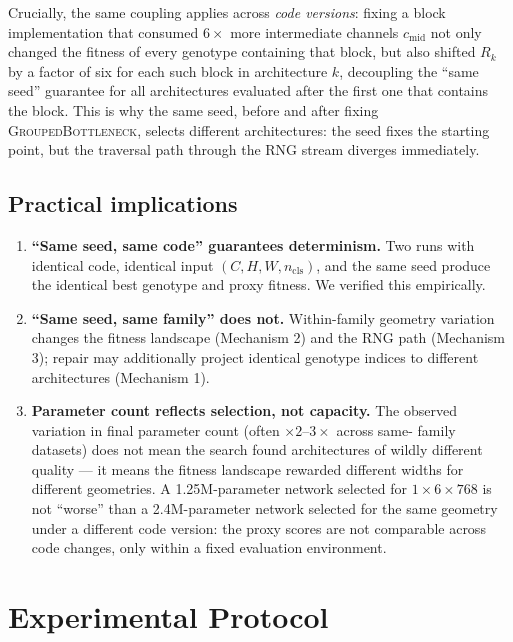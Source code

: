 \documentclass[10pt,twocolumn]{article}
\begin{document}
Crucially, the same coupling applies across \emph{code versions}: fixing a
block implementation that consumed $6\times$ more intermediate channels
$c_{\text{mid}}$ not only changed the fitness of every genotype containing that
block, but also shifted $R_k$ by a factor of six for each such block in
architecture $k$, decoupling the ``same seed'' guarantee for all architectures
evaluated after the first one that contains the block. This is why the same
seed, before and after fixing \textsc{GroupedBottleneck}, selects different
architectures: the seed fixes the starting point, but the traversal path
through the RNG stream diverges immediately.

\subsection{Practical implications}
\begin{enumerate}\itemsep2pt
\item \textbf{``Same seed, same code'' guarantees determinism.} Two runs with
  identical code, identical input $(C,H,W,n_{\text{cls}})$, and the same seed
  produce the identical best genotype and proxy fitness.  We verified this
  empirically.
\item \textbf{``Same seed, same family'' does not.}  Within-family geometry
  variation changes the fitness landscape (Mechanism 2) and the RNG path
  (Mechanism 3); repair may additionally project identical genotype indices to
  different architectures (Mechanism 1).
\item \textbf{Parameter count reflects selection, not capacity.}  The observed
  variation in final parameter count (often $\times 2$--$3\times$ across same-
  family datasets) does not mean the search found architectures of wildly
  different quality --- it means the fitness landscape rewarded different widths
  for different geometries. A 1.25M-parameter network selected for
  $1{\times}6{\times}768$ is not ``worse'' than a 2.4M-parameter network
  selected for the same geometry under a different code version: the proxy
  scores are not comparable across code changes, only within a fixed evaluation
  environment.
\end{enumerate}

\section{Experimental Protocol}
\label{sec:protocol}
\end{document}
